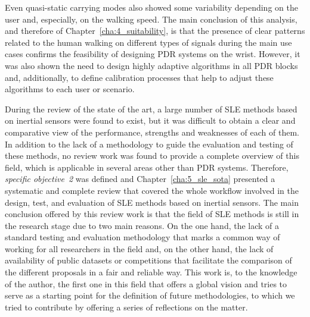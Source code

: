 Even quasi-static carrying modes also showed some variability depending on the user and, especially, on the walking speed.
The main conclusion of this analysis, and therefore of Chapter~\ref{cha:4_suitability}, is that the presence of clear patterns related to the human walking on different types of signals during the main use cases confirms the feasibility of designing PDR systems on the wrist. 
However, it was also shown the need to design highly adaptive algorithms in all PDR blocks and, additionally, to define calibration processes that help to adjust these algorithms to each user or scenario.

During the review of the state of the art, a large number of SLE methods based on inertial sensors were found to exist, but it was difficult to obtain a clear and comparative view of the performance, strengths and weaknesses of each of them.
In addition to the lack of a methodology to guide the evaluation and testing of these methods, no review work was found to provide a complete overview of this field, which is applicable in several areas other than PDR systems.
Therefore, \emph{specific objective~2} was defined and Chapter~\ref{cha:5_sle_sota} presented a systematic and complete review that covered the whole workflow involved in the design, test, and evaluation of SLE methods based on inertial sensors.
The main conclusion offered by this review work is that the field of SLE methods is still in the research stage due to two main reasons. On the one hand, the lack of a standard testing and evaluation methodology that marks a common way of working for all researchers in the field and, on the other hand, the lack of availability of public datasets or competitions that facilitate the comparison of the different proposals in a fair and reliable way.
This work is, to the knowledge of the author, the first one in this field that offers a global vision and tries to serve as a starting point for the definition of future methodologies, to which we tried to contribute by offering a series of reflections on the matter.

